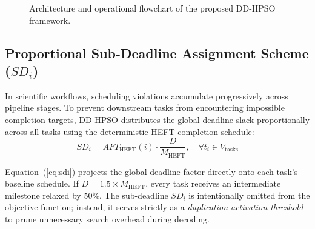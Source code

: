 \documentclass[journal]{IEEEtran}
\begin{document}
\begin{figure}[t]
\caption{Architecture and operational flowchart of the proposed DD-HPSO framework.}
\label{fig:architecture}
\end{figure}

\subsection{Proportional Sub-Deadline Assignment Scheme ($SD_i$)}
In scientific workflows, scheduling violations accumulate progressively across pipeline stages. To prevent downstream tasks from encountering impossible completion targets, DD-HPSO distributes the global deadline slack proportionally across all tasks using the deterministic HEFT completion schedule:
\begin{equation}
SD_i = AFT_{\text{HEFT}}(i) \cdot \frac{D}{M_{\text{HEFT}}}, \quad \forall t_i \in V_{\text{tasks}}
\label{eq:sdi}
\end{equation}

Equation~(\ref{eq:sdi}) projects the global deadline factor directly onto each task's baseline schedule. If $D = 1.5 \times M_{\text{HEFT}}$, every task receives an intermediate milestone relaxed by 50\%. The sub-deadline $SD_i$ is intentionally omitted from the objective function; instead, it serves strictly as a \textit{duplication activation threshold} to prune unnecessary search overhead during decoding.
\end{document}
